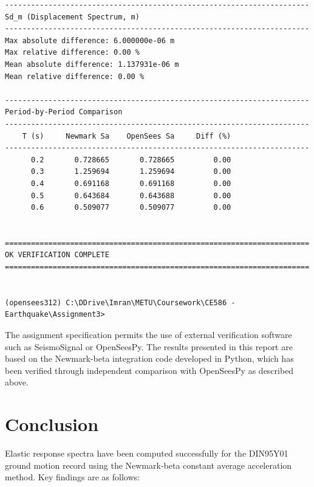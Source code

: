 ﻿\documentclass[12pt]{article}
\begin{document}
\begin{Verbatim}[fontsize=\scriptsize]
----------------------------------------------------------------------
Sd_m (Displacement Spectrum, m)
----------------------------------------------------------------------
Max absolute difference: 6.000000e-06 m
Max relative difference: 0.00 %
Mean absolute difference: 1.137931e-06 m
Mean relative difference: 0.00 %

----------------------------------------------------------------------
Period-by-Period Comparison
----------------------------------------------------------------------
    T (s)     Newmark Sa    OpenSees Sa     Diff (%)
----------------------------------------------------------------------
      0.2       0.728665       0.728665         0.00
      0.3       1.259694       1.259694         0.00
      0.4       0.691168       0.691168         0.00
      0.5       0.643684       0.643688         0.00
      0.6       0.509077       0.509077         0.00


======================================================================
OK VERIFICATION COMPLETE
======================================================================


(opensees312) C:\DDrive\Imran\METU\Coursework\CE586 - Earthquake\Assignment3>
\end{Verbatim}

The assignment specification permits the use of external verification software such as SeismoSignal or OpenSeesPy. The results presented in this report are based on the Newmark-beta integration code developed in Python, which has been verified through independent comparison with OpenSeesPy as described above.

\section{Conclusion}

Elastic response spectra have been computed successfully for the DIN95Y01 ground motion record using the Newmark-beta constant average acceleration method. Key findings are as follows:
\end{document}
